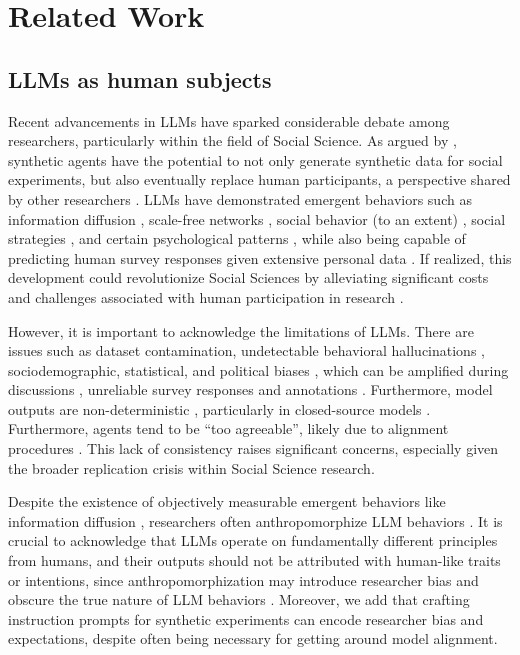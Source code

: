 %
\section{Related Work}

\subsection{LLMs as human subjects}
\label{ssec:related:human-llm}

Recent advancements in \acp{LLM} have sparked considerable debate among researchers, particularly within the field of Social Science. As argued by \citet{grossman_2023}, synthetic agents have the potential to not only generate synthetic data for social experiments, but also eventually replace human participants, a perspective shared by other researchers \cite{tornberg_2023, argyle2023}. \acp{LLM} have demonstrated emergent behaviors such as information diffusion \cite{Park2023GenerativeAI}, scale-free networks \cite{demarzo_2023}, social behavior (to an extent) \cite{leng_2024}, social strategies \cite{abdelnabi_negotiations}, and certain psychological patterns \cite{abramski_2023}, while also being capable of predicting human survey responses given extensive personal data \cite{park2024generativeagentsimulations1000}. If realized, this development could revolutionize Social Sciences by alleviating significant costs and challenges associated with human participation in research \cite{rossi_2024, shapiro2019polling}.

However, it is important to acknowledge the limitations of \acp{LLM}. There are issues such as dataset contamination, undetectable behavioral hallucinations \cite{rossi_2024}, sociodemographic, statistical, and political biases \cite{anthis_2025,hewitt2024predicting,rossi_2024}, which can be amplified during discussions \cite{Taubenfeld2024SystematicBI}, unreliable survey responses \cite{jansen_2023,bisbee_2023,neumann_2025} and annotations \cite{Gligoric2024CanUL}. Furthermore, model outputs are non-deterministic \cite{atil_2025}, particularly in closed-source models \cite{bisbee_2023}. Furthermore, agents tend to be “too agreeable”, likely due to alignment procedures \cite{Park2023GenerativeAI, anthis_2025, rossi_2024}. This lack of consistency raises significant concerns, especially given the broader replication crisis within Social Science research.

Despite the existence of objectively measurable emergent behaviors like information diffusion \cite{Park2023GenerativeAI}, researchers often anthropomorphize \ac{LLM} behaviors \cite{rossi_2024}. It is crucial to acknowledge that \acp{LLM} operate on fundamentally different principles from humans, and their outputs should not be attributed with human-like traits or intentions, since anthropomorphization may introduce researcher bias and obscure the true nature of \ac{LLM} behaviors \cite{anthis_2025,zhou-etal-2024-real}. Moreover, we add that crafting instruction prompts for synthetic experiments can encode researcher bias and expectations, despite often being necessary for getting around model alignment.


